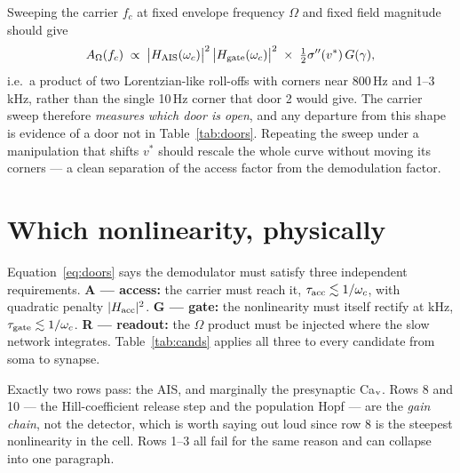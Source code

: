 \documentclass[11pt,a4paper]{article}
\newcommand{\Aom}{A_\Omega}
\begin{document}
Sweeping the carrier $f_c$ at fixed envelope frequency $\Omega$ and fixed field magnitude should give
\begin{equation}
\Aom(f_c)\;\propto\;\bigl|H_{\rm AIS}(\omega_c)\bigr|^2\,\bigl|H_{\rm gate}(\omega_c)\bigr|^2
\;\times\;\tfrac12\sigma''(v^*)\,G(\gamma),
\end{equation}
i.e.\ a product of two Lorentzian-like roll-offs with corners near 800\,Hz and 1--3\,kHz, rather than the
single 10\,Hz corner that door 2 would give. The carrier sweep therefore \emph{measures which door is
open}, and any departure from this shape is evidence of a door not in Table~\ref{tab:doors}. Repeating
the sweep under a manipulation that shifts $v^*$ should rescale the whole curve without moving its
corners --- a clean separation of the access factor from the demodulation factor.

\section{Which nonlinearity, physically}

Equation~\eqref{eq:doors} says the demodulator must satisfy three independent requirements.
\textbf{A --- access:} the carrier must reach it, $\tau_{\rm acc}\lesssim1/\omega_c$, with quadratic
penalty $|H_{\rm acc}|^2$. \textbf{G --- gate:} the nonlinearity must itself rectify at kHz,
$\tau_{\rm gate}\lesssim1/\omega_c$. \textbf{R --- readout:} the $\Omega$ product must be injected where
the slow network integrates. Table~\ref{tab:cands} applies all three to every candidate from soma to
synapse.

Exactly two rows pass: the AIS, and marginally the presynaptic Ca$_{\rm v}$. Rows 8 and 10 --- the
Hill-coefficient release step and the population Hopf --- are the \emph{gain chain}, not the detector,
which is worth saying out loud since row 8 is the steepest nonlinearity in the cell. Rows 1--3 all fail
for the same reason and can collapse into one paragraph.
\end{document}
